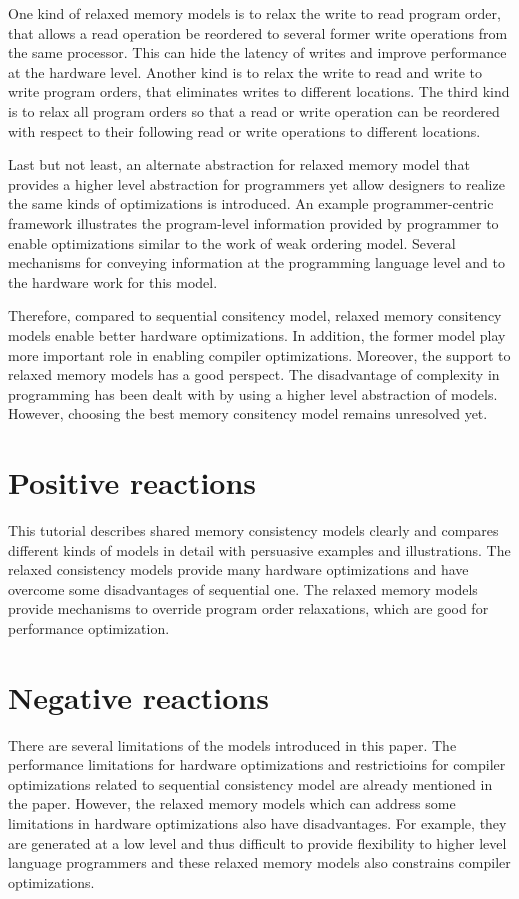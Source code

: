 \documentclass[10pt, letterpaper]{article}
\begin{document}
One kind of relaxed memory models is to relax the write to read program order, that allows a read operation be
reordered to several former write operations from the same processor. This can hide the latency of writes and improve performance at the
hardware level. Another kind is to relax the write to read and write to write program orders, that eliminates
writes to different locations. The third kind is to relax all program orders so that a read or write operation
can be reordered with respect to their following read or write operations to different locations. 

Last but not least, an alternate abstraction for relaxed memory model that provides a higher level abstraction
for programmers yet allow designers to realize the same kinds of optimizations is introduced. An example
programmer-centric framework illustrates the program-level information provided by programmer to
enable optimizations similar to the work of weak ordering model. Several mechanisms for conveying
information at the programming language level and to the hardware work for this model. 

Therefore, compared to sequential consitency model, relaxed memory consitency models enable better hardware
optimizations. In addition, the former model play more important role in enabling compiler optimizations.
Moreover, the support to relaxed memory models has a good perspect. The disadvantage of complexity in
programming has been dealt with by using a higher level abstraction of models. However, choosing the best memory
consitency model remains unresolved yet.
\section{Positive reactions}
\label{sec-formatting}
This tutorial describes shared memory consistency models clearly and compares different kinds of models in detail
with persuasive examples and illustrations. The relaxed consistency models provide many hardware optimizations
and have overcome some disadvantages of sequential one. The relaxed memory models provide mechanisms to override
program order relaxations, which are good for performance optimization.

\section{Negative reactions}
\label{sec-formatting}
There are several limitations of the models introduced in this paper. The performance limitations for hardware
optimizations and restrictioins for compiler optimizations related to sequential consistency model are already
mentioned in the paper. However, the relaxed memory models which can address some limitations in hardware
optimizations also have
disadvantages. For example, they are generated at a low level and thus difficult to provide flexibility to higher
level language programmers and these relaxed memory models also constrains compiler optimizations. 
\end{document}
